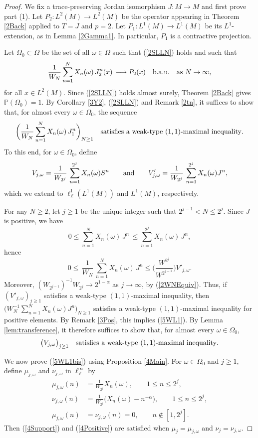 \documentclass[12pt]{amsart}
\newcommand{\Pdb}{\mbox{$\mathbb{P}$}}
\theoremstyle{remark}
\theoremstyle{definition}
\numberwithin{equation}{section}
\begin{document}
\begin{proof}
We fix a trace-preserving Jordan isomorphism
$J\colon M\to M$ and first prove part (1).
Let $P_2\colon L^2(M)\to L^2(M)$ be the operator appearing
in Theorem \ref{2Back} applied to $T=J$ and $p=2$.
Let $P_1\colon L^1(M)\to L^1(M)$ be its $L^1$-extension,
as in Lemma \ref{2Gamma1}. In particular, $P_1$ is a
contractive projection.
 
Let $\Omega_0\subset\Omega$ be 
the set of all $\omega\in\Omega$ such that 
(\ref{2SLLN}) holds and  such that 
$$
\frac{1}{W_N}\sum_{n=1}^N X_n(\omega)\, J_2^n(x)
\,\longrightarrow P_2(x)\quad\hbox{b.a.u.}
\quad\hbox{as } N\to\infty,
$$
for all $x\in L^2(M)$.  Since (\ref{2SLLN}) holds almost surely,
Theorem \ref{2Back} gives $\Pdb(\Omega_0)=1$.
By Corollary \ref{3Y2}, (\ref{2SLLN}) and Remark \ref{2tn},
it suffices to show that, for almost every $\omega\in\Omega_0$,
the sequence
\begin{equation}\label{5WL1}
\biggl(\frac{1}{W_N}\sum_{n=1}^N X_n(\omega)\,J_1^n\biggr)_{N\geq 1}
\quad\hbox{satisfies a weak-type }(1,1)\hbox{-maximal inequality}.
\end{equation} 
To this end, for $\omega\in\Omega_0$, define
$$
V_{j,\omega} = \frac{1}{W_{2^j}}\,
\sum_{n=1}^{2^j} X_n(\omega) S^n
\qquad\hbox{and}\qquad
V'_{j,\omega} = \frac{1}{W_{2^j}}\,
\sum_{n=1}^{2^j} X_n(\omega) J^n,
$$
which we extend to $\ell^1_{\mathbb Z}(L^1(M))$ and $L^1(M)$,
respectively.

For any $N\geq 2$, let 
$j\geq 1$ be the unique integer such that $2^{j-1}<N\leq 2^j$. Since $J$ is positive, we have
$$
0\leq \sum_{n=1}^N X_n(\omega)\, J^n\,\leq 
\sum_{n=1}^{2^j} X_n(\omega)\, J^n,
$$
hence
$$
0\leq\,\frac{1}{W_N}\,
\sum_{n=1}^N X_n(\omega)\, J^n
\leq \biggl(\frac{W^{2^j}}{W^{2^{j-1}}}\biggr)
V'_{j,\omega}.
$$
Moreover, $(W_{2^{j-1}})^{-1}W_{2^j}\to 2^{1-\alpha}$ as $j\to\infty$, by (\ref{2WNEquiv}). 
Thus, if $(V'_{j,\omega})_{j\geq1}$ satisfies a weak-type
$(1,1)$-maximal inequality, then
$\bigl(W_N^{-1}\sum_{n=1}^N X_n(\omega)J^n\bigr)_{N\geq1}$
satisfies a weak-type $(1,1)$-maximal inequality for positive
elements. By Remark \ref{3Pos}, this implies (\ref{5WL1}). By Lemma \ref{lem:transference}, it therefore suffices to show that,
for almost every $\omega\in\Omega_0$,
\begin{equation}\label{5WL1bis}
\bigl(V_{j,\omega}\bigr)_{j\geq1}
\quad\hbox{satisfies a weak-type }(1,1)\hbox{-maximal inequality}.
\end{equation}


We now prove (\ref{5WL1bis}) using Proposition \ref{4Main}. For $\omega\in\Omega_0$ and $j\geq1$, define
$\mu_{j,\omega}$ and $\nu_{j,\omega}$ in
$\ell^\infty_{\mathbb Z}$ by
\begin{align*}
\mu_{j,\omega}(n) & = \frac{1}{W_{2^j}}X_n(\omega),\qquad 1\leq n\leq 2^j,\\
\nu_{j,\omega}(n) & = \frac{1}{W_{2^j}}\bigl(X_n(\omega)-n^{-\alpha}
\bigr),\qquad 1\leq n\leq 2^j,\\
\mu_{j,\omega}(n) & =\nu_{j,\omega}(n)=0,\qquad n\notin[1,2^j].
\end{align*}
Then (\ref{4Support}) and (\ref{4Positive}) 
are satisfied when $\mu_j=\mu_{j,\omega}$
and $\nu_j=\nu_{j,\omega}$.


\end{proof}
\end{document}
